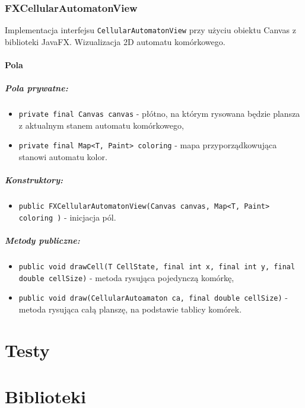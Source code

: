 \documentclass{report}
\begin{document}
\subsection{FXCellularAutomatonView}
Implementacja interfejsu \texttt{CellularAutomatonView} przy użyciu obiektu Canvas z biblioteki JavaFX. Wizualizacja 2D automatu komórkowego.
\subsubsection{Pola}
\paragraph{Pola prywatne:}
\begin{itemize}
	\item \texttt{private final Canvas canvas} - płótno, na którym rysowana będzie plansza z aktualnym stanem automatu komórkowego,
	\item \texttt{private final Map<T, Paint> coloring} - mapa przyporządkowująca stanowi automatu kolor.
\end{itemize}
\paragraph{Konstruktory:}
\begin{itemize}
	\item \texttt{public FXCellularAutomatonView(Canvas canvas, Map<T, Paint> coloring )} - inicjacja pól.
\end{itemize}
\paragraph{Metody publiczne:}
\begin{itemize}
	\item \texttt{public void drawCell(T CellState, final int x, final int y, final double cellSize)} - metoda rysująca pojedynczą komórkę,
	\item \texttt{public void draw(CellularAutoamaton ca, final double cellSize)} - metoda rysująca całą planszę, na podstawie tablicy komórek.
\end{itemize}



\chapter{Testy}

\chapter{Biblioteki}
\end{document}

